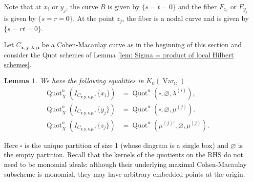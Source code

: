 \documentclass[12pt]{amsart}
\newtheorem{lemma}[theorem]{Lemma}
\theoremstyle{definition}
\newcommand{\CC} {\mathbb{C}}          %
\newcommand{\Quot}{\operatorname{Quot}}
\newcommand{\Var}{\operatorname{Var}}
\newcommand{\boldx}{\boldsymbol{x}}
\newcommand{\boldy}{\boldsymbol{y}}
\newcommand{\boldlambda}{\boldsymbol{\lambda }}
\newcommand{\boldmu}{\boldsymbol{\mu }}
\renewcommand{\emptyset}{\varnothing}
\newcommand{\bx}{\square}
\newcommand{\mujprime}{\mu^{(j)\prime}}
\begin{document}
Note that at $x_{i}$ or $y_{j}$, the curve $B$ is given by $\{s=t=0
\}$ and the fiber $F_{x_{i}}$ or $F_{y_{j}}$ is given by $\{s=r=0
\}$. At the point $z_{j}$, the fiber is a nodal curve and is given by
$\{s=rt=0 \}$.

Let $C_{\boldx, \boldy, \boldlambda, \boldmu}$ be a Cohen-Macaulay curve as in the beginning of this section and consider the Quot schemes of Lemma \ref{lem: Sigma = product of local Hilbert schemes}. 

\begin{lemma} \label{Quotboxes}
We have the following equalities in $K_0(\Var_{\CC})$
\begin{align*}
\Quot^{n}_X\left( I_{C_{\boldx, \boldy, \boldlambda, \boldmu}}, \{x_i\} \right)&=
\Quot^{n}\left(\bx ,\emptyset ,\lambda^{(i)} \right),\\
\Quot^{n}_X\left(I_{C_{\boldx, \boldy, \boldlambda, \boldmu}}, \{y_{j}\} \right)&=
\Quot^{n}\left(\bx ,\emptyset ,\mu^{(j)} \right),\\
\Quot^{n}_X\left(I_{C_{\boldx, \boldy, \boldlambda, \boldmu}}, \{z_{j}\} \right)&=
\Quot^{n}\left(\mujprime ,\emptyset ,\mu^{(j)} \right).
\end{align*}
\end{lemma}
Here $\bx$ is the unique partition of size 1 (whose diagram is a
single box) and $\emptyset$ is the empty partition. Recall that the
kernels of the quotients on the RHS do not need to be monomial ideals: although their underlying maximal Cohen-Macaulay
subscheme is monomial, they may have arbitrary embedded points at the
origin.
\end{document}
